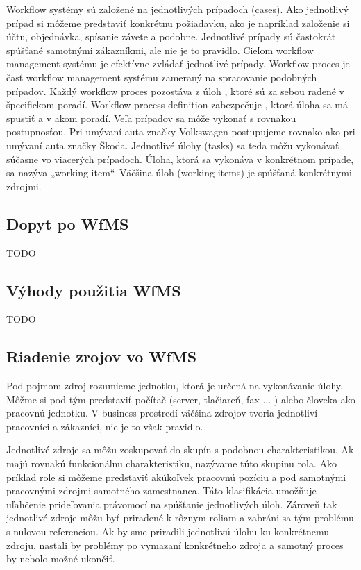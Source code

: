 Workflow systémy sú založené na jednotlivých prípadoch (cases). Ako jednotlivý prípad si môžeme predstaviť 	 konkrétnu požiadavku, ako je napríklad založenie si účtu, objednávka, spísanie závete a podobne. Jednotlivé prípady sú častokrát spúšťané samotnými zákazníkmi, ale nie je to pravidlo. Cieľom workflow management systému je efektívne zvládať jednotlivé prípady. Workflow proces je časť workflow management systému zameraný na spracovanie podobných prípadov. Každý workflow proces pozostáva z úloh , ktoré sú za sebou radené v špecifickom poradí. Workflow process definition zabezpečuje , ktorá úloha sa má spustiť a v akom poradí. Veľa prípadov sa môže vykonať s rovnakou postupnosťou. Pri umývaní auta značky Volkswagen postupujeme rovnako ako pri umývaní auta značky Škoda. Jednotlivé úlohy (tasks) sa teda môžu vykonávať súčasne vo viacerých prípadoch. Úloha, ktorá sa vykonáva v konkrétnom prípade, sa nazýva „working item“. Väčšina úloh (working items) je spúšťaná  konkrétnymi zdrojmi. \cite{workflow_systemy}


\subsection{Dopyt po WfMS}
TODO

\subsection{Výhody použitia WfMS}
TODO

\subsection{Riadenie zrojov vo WfMS}
Pod pojmom zdroj rozumieme jednotku, ktorá je určená na vykonávanie úlohy. Môžme si pod tým predstaviť počítač (server, tlačiareň, fax ... ) alebo človeka ako pracovnú jednotku. V business prostredí väčšina zdrojov tvoria jednotliví pracovníci a zákazníci, nie je to však pravidlo.

Jednotlivé zdroje sa môžu zoskupovať do skupín s podobnou charakteristikou. Ak majú rovnakú funkcionálnu charakteristiku, nazývame túto skupinu rola.
Ako príklad role si môžeme predstaviť akúkoľvek pracovnú pozíciu a pod samotnými pracovnými zdrojmi samotného zamestnanca. Táto klasifikácia umožňuje uľahčenie prideľovania právomocí na spúšťanie jednotlivých úloh. Zároveň tak jednotlivé zdroje môžu byť priradené k rôznym roliam a zabráni sa tým problému s nulovou referenciou. Ak by sme priradili jednotlivú úlohu ku konkrétnemu zdroju, nastali by problémy po vymazaní konkrétneho zdroja a samotný proces by nebolo možné ukončiť.



